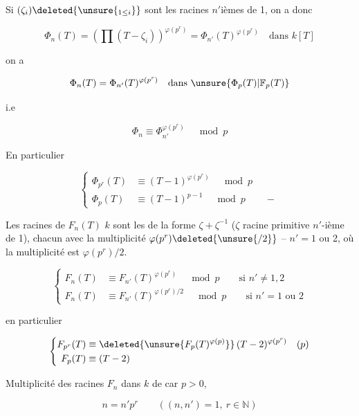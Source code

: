 Si $(\zeta_i)\deleted{\unsure{_{1\leq i}}}$ sont les racines   $n'$ièmes de 1, on a donc

\[
\Phi_n(T)=\left(\prod(T-\zeta_i)\right)^{\varphi(p^r)}=\Phi_{n'}(T)^{\varphi(p^r)}\quad\text{dans }k[T]
\]

 on a

\[
\Phi_n(T)=\Phi_{n'}(T)^{\varphi(p^r)}\quad\text{dans }\unsure{\Phi_p(T)|\mathbb F_p(T)}
\]

i.e

\[
\Phi_n\equiv\Phi_{n'}^{\varphi(p^r)}\quad\bmod p
\]

En particulier

\[
\left\{\begin{aligned}
\Phi_{p^r}(T)&\equiv(T-1)^{\varphi(p^r)}\quad\bmod p\\
\Phi_p(T)&\equiv(T-1)^{p-1}\quad\bmod p\qquad -
\end{aligned}\right.
\]

 Les racines de $F_n(T)$  $k$ sont les  de la forme $\zeta+\zeta^{-1}$ ($\zeta$ racine primitive $n'$-ième de 1), chacun avec la multiplicité $\varphi(p^r)\deleted{\unsure{/2}}$ --   $n'=1$ ou 2, où la multiplicité est $\varphi(p^r)/2$.

\[
\left\{\begin{aligned}
F_n(T)&\equiv F_{n'}(T)^{\varphi(p^r)}\quad\bmod p\qquad\text{si }n'\ne1,2\\
F_n(T)&\equiv F_{n'}(T)^{\varphi(p^r)/2}\quad\bmod p\qquad\text{si }n'=1\text{ ou }2
\end{aligned}\right.
\]

en particulier

\[
\left\{\begin{aligned}
F_{p^r}(T)&\equiv\deleted{\unsure{F_p(T)^{\varphi(p)}}}\,(T-2)^{\varphi(p^r)}\quad(p)\\
F_p(T)&\equiv(T-2)
\end{aligned}\right.
\]



Multiplicité \inserted{$\mu$} des racines  $F_n$  dans $k$ de car $p>0$,

\[
n=n'p^r\qquad((n,n')=1,\ r\in\mathbb N)
\]

